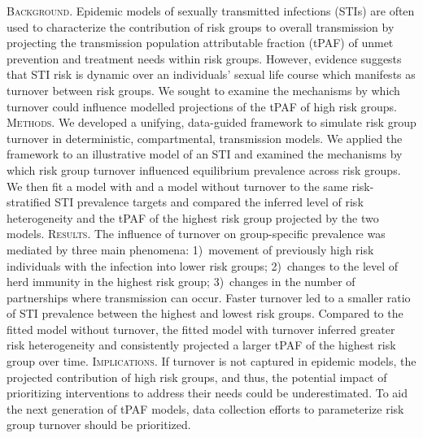 \textsc{Background.}
Epidemic models of sexually transmitted infections (STIs)
are often used to characterize
the contribution of risk groups
to overall transmission
by projecting the transmission population attributable fraction (tPAF)
of unmet prevention and treatment needs within risk groups.
However, evidence suggests that
STI risk is dynamic over an individuals' sexual life course which
manifests as turnover between risk groups.
We sought to examine the mechanisms by which turnover could
influence modelled projections of the tPAF of high risk groups.
\textsc{Methods.}
We developed a unifying, data-guided framework to simulate risk group turnover
in deterministic, compartmental, transmission models.
We applied the framework to an illustrative model of an STI
and examined the mechanisms by which
risk group turnover influenced equilibrium prevalence across risk groups.
We then fit a model with and a model without turnover to the same
risk-stratified STI prevalence targets
and compared the inferred level of risk heterogeneity and
the tPAF of the highest risk group projected by the two models.
\textsc{Results.}
The influence of turnover on group-specific prevalence
was mediated by three main phenomena:
1)~movement of previously high risk individuals with the infection into lower risk groups;
2)~changes to the level of herd immunity in the highest risk group;
3)~changes in the number of partnerships where transmission can occur.
Faster turnover led to
a smaller ratio of STI prevalence between the highest and lowest risk groups.
Compared to the fitted model without turnover,
the fitted model with turnover inferred greater risk heterogeneity
and consistently projected a larger tPAF of the highest risk group over time.
\textsc{Implications.}
If turnover is not captured in epidemic models,
the projected contribution of high risk groups, and thus,
the potential impact of prioritizing interventions to address their needs could be underestimated.
To aid the next generation of tPAF models,
data collection efforts to parameterize risk group turnover should be prioritized.